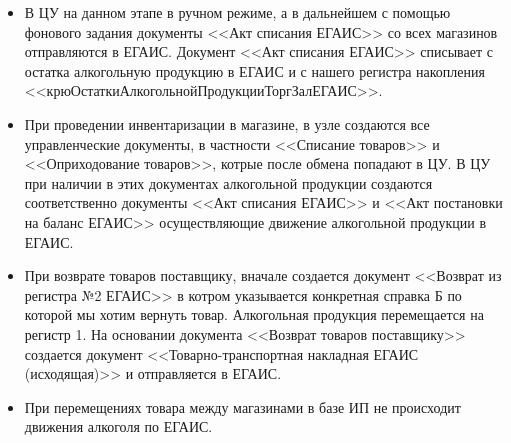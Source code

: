 \begin{itemize}
     \item В ЦУ на данном этапе в ручном режиме, а в дальнейшем с помощью фонового задания документы <<Акт списания ЕГАИС>> со всех магазинов отправляются в ЕГАИС. Документ <<Акт списания ЕГАИС>> списывает с остатка алкогольную продукцию в ЕГАИС и с нашего регистра накопления <<крюОстаткиАлкогольнойПродукцииТоргЗалЕГАИС>>.
     \item При проведении инвентаризации в магазине, в узле создаются все управленческие документы, в частности <<Списание товаров>> и <<Оприходование товаров>>, котрые после обмена попадают в ЦУ. В ЦУ при наличии в этих документах алкогольной продукции создаются соответственно документы <<Акт списания ЕГАИС>> и <<Акт постановки на баланс ЕГАИС>> осуществляющие движение алкогольной продукции в ЕГАИС.
     \item При возврате товаров поставщику,  вначале создается документ <<Возврат из регистра №2 ЕГАИС>>  в котром указывается конкретная справка Б по которой мы хотим вернуть товар. Алкогольная продукция перемещается на регистр 1. На основании документа <<Возврат товаров поставщику>> создается документ <<Товарно-транспортная накладная ЕГАИС (исходящая)>> и отправляется в ЕГАИС.
      \item При перемещениях товара между магазинами в базе ИП не происходит движения алкоголя по ЕГАИС.

 \end{itemize}
